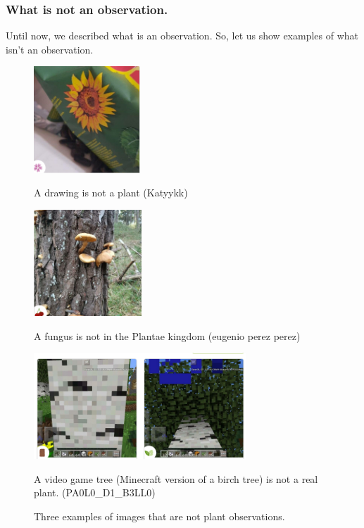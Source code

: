 \subsubsection{What is not an observation.}

Until now, we described what is an observation.
So, let us show examples of what isn't an observation.

\begin{figure}[bth]
        \centering
        \begin{minipage}[t]{0.25\textwidth}
            \centering
            \includegraphics[width=\textwidth,height=4cm]{./images_plantnet/katyykkk_no_plant.png}
            \caption*{A drawing is not a plant (\textcopyright Katyykk)}
        \end{minipage}
        \hfill
        \begin{minipage}[t]{0.25\textwidth}
            \centering
            \includegraphics[width=\textwidth,height=4cm]{./images_plantnet/eugenio_perez_perez_shroom.png}
            \caption*{A fungus is not in the Plantae kingdom (\textcopyright eugenio perez perez)}
        \end{minipage}
        \hfill
         \begin{minipage}[t]{0.47\textwidth}
                \centering
                \includegraphics[width=\textwidth,height=4cm]{./images_plantnet/PA0L0_D1_B3LL0_minecraft.png}
                \caption*{A video game tree (Minecraft version of a birch tree) is not a real plant. (\textcopyright PA0L0\_D1\_B3LL0)}
            \end{minipage}
        \caption{Three examples of images that are not plant observations.}
        \label{fig:not_an_observation}
    \end{figure}

